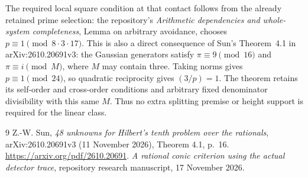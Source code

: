 \documentclass[11pt,a4paper]{article}
\begin{document}
The required local square condition at that contact follows from
the already retained prime selection: the repository's
\emph{Arithmetic dependencies and whole-system completeness}, Lemma
on arbitrary avoidance, chooses $p\equiv1\pmod{8\cdot3\cdot17}$.
This is also a direct consequence of Sun's Theorem~4.1 in
arXiv:2610.20691v3: the Gaussian generators satisfy
$\pi\equiv9\pmod{16}$ and $\pi\equiv i\pmod M$, where $M$
may contain three. Taking norms gives $p\equiv1\pmod{24}$,
so quadratic reciprocity gives $(3/p)=1$. The theorem retains its
self-order and cross-order conditions and arbitrary fixed denominator
divisibility with this same $M$. Thus no extra splitting premise or
height support is required for the linear class.

\begin{thebibliography}{9}
 Z.-W. Sun,
\emph{48 unknowns for Hilbert's tenth problem over the rationals},
arXiv:2610.20691v3 (11 November 2026), Theorem 4.1, p.~16.
\url{https://arxiv.org/pdf/2610.20691}.
 \emph{A rational conic criterion using the actual
detector trace}, repository research manuscript, 17 November 2026.
\end{thebibliography}
\end{document}
